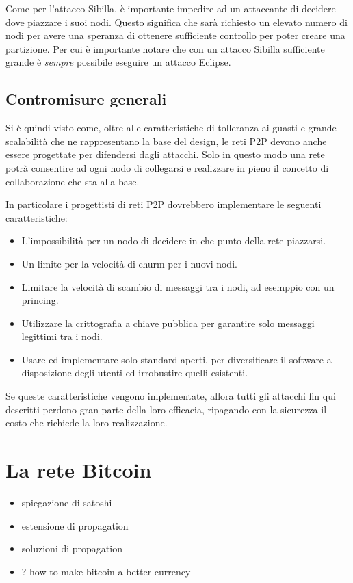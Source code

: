 Come per l'attacco Sibilla, è importante impedire ad un attaccante di
decidere dove piazzare i suoi nodi. Questo significa che sarà richiesto
un elevato numero di nodi per avere una speranza di ottenere sufficiente
controllo per poter creare una partizione. Per cui è importante notare
che con un attacco Sibilla sufficiente grande è \emph{sempre} possibile
eseguire un attacco Eclipse.

\subsection{Contromisure generali}\label{contromisure-generali}

Si è quindi visto come, oltre alle caratteristiche di tolleranza ai
guasti e grande scalabilità che ne rappresentano la base del design, le
reti P2P devono anche essere progettate per difendersi dagli attacchi.
Solo in questo modo una rete potrà consentire ad ogni nodo di collegarsi
e realizzare in pieno il concetto di collaborazione che sta alla base.

In particolare i progettisti di reti P2P dovrebbero implementare le
seguenti caratteristiche:

\begin{itemize}
\itemsep1pt\parskip0pt
\item
  L'impossibilità per un nodo di decidere in che punto della rete
  piazzarsi.
\item
  Un limite per la velocità di churm per i nuovi nodi.
\item
  Limitare la velocità di scambio di messaggi tra i nodi, ad esemppio
  con un princing.
\item
  Utilizzare la crittografia a chiave pubblica per garantire solo
  messaggi legittimi tra i nodi.
\item
  Usare ed implementare solo standard aperti, per diversificare il
  software a disposizione degli utenti ed irrobustire quelli esistenti.
\end{itemize}

Se queste caratteristiche vengono implementate, allora tutti gli
attacchi fin qui descritti perdono gran parte della loro efficacia,
ripagando con la sicurezza il costo che richiede la loro realizzazione.

\section{La rete Bitcoin}\label{la-rete-bitcoin}

\begin{itemize}
\itemsep1pt\parskip0pt
\item
  spiegazione di satoshi
\item
  estensione di propagation
\item
  soluzioni di propagation
\item
  ? how to make bitcoin a better currency
\end{itemize}

